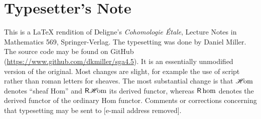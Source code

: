 
\section*{Typesetter's Note}

This is a \LaTeX{} rendition of Deligne's \emph{Cohomologie \'Etale},
Lecture Notes in Mathematics 569, Springer-Verlag. The typesetting was done by
Daniel Miller. The source code may be found on GitHub
(\url{https://www.github.com/dkmiller/sga4.5}). It is an essentially
unmodified version of the original. Most changes are slight, for example the
use of script rather than roman letters for sheaves. The most substantial
change is that $\operatorname{\mathscr{H}\!om}$ denotes ``sheaf Hom'' and $\operatorname{\mathsf{R}\mathscr{H}\!om}$ its derived functor,
whereas $\operatorname{\mathsf{R}\hom}$ denotes the derived functor of the ordinary Hom functor.
Comments or corrections concerning that typesetting may be sent to
[e-mail address removed].

